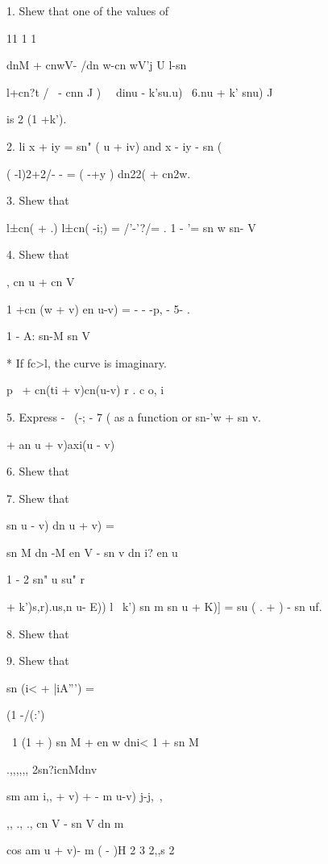 1. Shew that one of the values of

11 1 1

dnM + cnwV- /dn w-cn wV'j U l-sn%

l+cn?t / \ - cnn J ) \ \ dinu - k'su.u) \ 6.nu + k' snu) J

is 2 (1 +k'). 

2. li x + iy = sn" ( u + iv) and x - iy - sn (%

 ( -l)2+2/- - = ( -+y ) dn22( + cn2w.


3. Shew that

 l±cn( + .) l±cn( -i;) = /'-'?/= . 1 - '= sn w sn- V

4. Shew that

, cn u + cn V

1 +cn (w + v) en u-v) = - - -p, - 5- .

  1 - A: sn-M sn V

 * If fc>l, the curve is imaginary.

%
%

p \ + cn(ti + v)cn(u-v) r . c o, i

5. Express - \ (-; - 7 ( as a function or sn-'w + sn v.

   + an u + v)axi(u - v)

6. Shew that

7. Shew that

sn u - v) dn u + v) =

sn M dn -M en V - sn v dn i? en u

1 - 2 sn" u su" r


    + k')s,r).us,n u- E)) l~ k') sn m sn u + K)] = su ( . + ) - sn uf.


8. Shew that

9. Shew that

sn (i< + |iA''') =

(1 -/(:')

\ 1 (1 + ) sn M + en w dni< 1 + sn M

.,,,,,, 2sn?icnMdnv

sm am i,, + v) + - m u-v) j-j,~,

,, ., ., cn V - sn V dn m

cos am u + v)- m ( - )H 2 3 2,,s 2 

